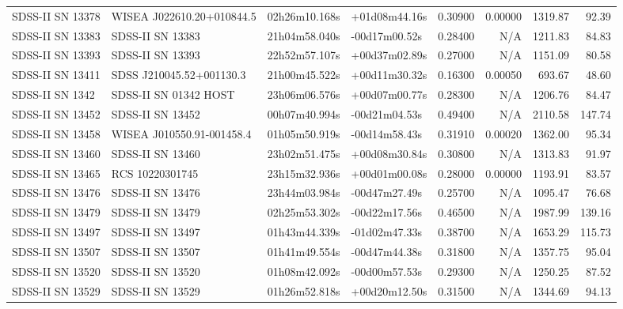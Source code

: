 \begin{longtable}{llllrrrr}
SDSS-II SN 13378 &       WISEA J022610.20+010844.5 &   02h26m10.168s &   +01d08m44.16s &  0.30900 &  0.00000 &  1319.87 &       92.39 \\
SDSS-II SN 13383 &                SDSS-II SN 13383 &   21h04m58.040s &   -00d17m00.52s &  0.28400 &      N/A &  1211.83 &       84.83 \\
SDSS-II SN 13393 &                SDSS-II SN 13393 &   22h52m57.107s &   +00d37m02.89s &  0.27000 &      N/A &  1151.09 &       80.58 \\
SDSS-II SN 13411 &        SDSS J210045.52+001130.3 &   21h00m45.522s &   +00d11m30.32s &  0.16300 &  0.00050 &   693.67 &       48.60 \\
SDSS-II SN 1342  &           SDSS-II SN 01342 HOST &   23h06m06.576s &   +00d07m00.77s &  0.28300 &      N/A &  1206.76 &       84.47 \\
SDSS-II SN 13452 &                SDSS-II SN 13452 &   00h07m40.994s &   -00d21m04.53s &  0.49400 &      N/A &  2110.58 &      147.74 \\
SDSS-II SN 13458 &       WISEA J010550.91-001458.4 &   01h05m50.919s &   -00d14m58.43s &  0.31910 &  0.00020 &  1362.00 &       95.34 \\
SDSS-II SN 13460 &                SDSS-II SN 13460 &   23h02m51.475s &   +00d08m30.84s &  0.30800 &      N/A &  1313.83 &       91.97 \\
SDSS-II SN 13465 &                 RCS 10220301745 &   23h15m32.936s &   +00d01m00.08s &  0.28000 &  0.00000 &  1193.91 &       83.57 \\
SDSS-II SN 13476 &                SDSS-II SN 13476 &   23h44m03.984s &   -00d47m27.49s &  0.25700 &      N/A &  1095.47 &       76.68 \\
SDSS-II SN 13479 &                SDSS-II SN 13479 &   02h25m53.302s &   -00d22m17.56s &  0.46500 &      N/A &  1987.99 &      139.16 \\
SDSS-II SN 13497 &                SDSS-II SN 13497 &   01h43m44.339s &   -01d02m47.33s &  0.38700 &      N/A &  1653.29 &      115.73 \\
SDSS-II SN 13507 &                SDSS-II SN 13507 &   01h41m49.554s &   -00d47m44.38s &  0.31800 &      N/A &  1357.75 &       95.04 \\
SDSS-II SN 13520 &                SDSS-II SN 13520 &   01h08m42.092s &   -00d00m57.53s &  0.29300 &      N/A &  1250.25 &       87.52 \\
SDSS-II SN 13529 &                SDSS-II SN 13529 &   01h26m52.818s &   +00d20m12.50s &  0.31500 &      N/A &  1344.69 &       94.13 \\

\end{longtable}
